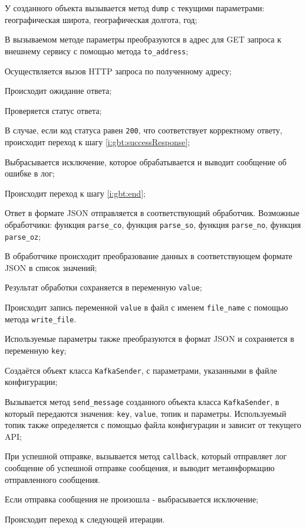 \begin{enumerate_step}
    \item У созданного объекта вызывается метод \texttt{dump} с текущими параметрами: географическая широта, географическая долгота, год;
    \item В вызываемом методе параметры преобразуются в адрес для GET запроса к внешнему сервису с помощью метода \texttt{to\_address};
    \item Осуществляется вызов HTTP запроса по полученному адресу;
    \item Происходит ожидание ответа;
    \item Проверяется статус ответа;
    \item В случае, если код статуса равен \texttt{200}, что соответствует корректному ответу, происходит переход к шагу \ref{i:gbt:successResponse};
    \item Выбрасывается исключение, которое обрабатывается и выводит сообщение об ошибке в лог;
    \item Происходит переход к шагу \ref{i:gbt:end};
    \item \label{i:gbt:successResponse} Ответ в формате JSON отправляется в соответствующий обработчик. 
    Возможные обработчики: функция \texttt{parse\_co}, функция \texttt{parse\_so}, функция \texttt{parse\_no}, функция \texttt{parse\_oz};
    \item В обработчике происходит преобразование данных в соответствующем формате JSON в список значений;
    \item Результат обработки сохраняется в переменную \texttt{value};
    \item Происходит запись переменной \texttt{value} в файл с именем \texttt{file\_name} с помощью метода \texttt{write\_file}.
    \item \label{i:gbt:sendMessage} Используемые параметры также преобразуются в формат JSON и сохраняется в переменную \texttt{key};
    \item Создаётся объект класса \texttt{KafkaSender}, с параметрами, указанными в файле конфигурации;
    \item Вызывается метод \texttt{send\_message} созданного объекта класса \texttt{KafkaSender}, в который передаются значения: \texttt{key}, \texttt{value}, топик и параметры. 
    Используемый топик также определяется с помощью файла конфигурации и зависит от текущего API;
    \item При успешной отправке, вызывается метод \texttt{callback}, который отправляет лог сообщение об успешной отправке сообщения, и выводит метаинформацию отправленного сообщения.
    \item Если отправка сообщения не произошла - выбрасывается исключение;
    \item \label{i:gbt:end} Происходит переход к следующей итерации.
\end{enumerate_step}


